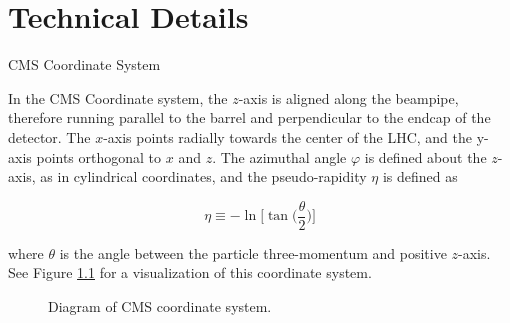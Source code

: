 \chapter{Technical Details}
\begin{section}{CMS Coordinate System}\label{appendix:cms-coords}

In the CMS Coordinate system, the $z$-axis is aligned along the beampipe, therefore running parallel to the barrel and perpendicular to the endcap of the detector. The $x$-axis points radially towards the center of the LHC, and the y-axis points orthogonal to $x$ and $z$. The azimuthal angle $\varphi$ is defined about the $z$-axis, as in cylindrical coordinates, and the pseudo-rapidity $\eta$ is defined as

\begin{equation}
    \eta \equiv -\ln{\bigg[ \tan{\bigg( \frac{\theta}{2} \bigg)} \bigg]}
\end{equation}

\noindent where $\theta$ is the angle between the particle three-momentum and positive $z$-axis. See Figure \ref{fig:cms-coords} for a visualization of this coordinate system.

\begin{figure}[htb]
\begin{center}

\end{center}
\caption{Diagram of CMS coordinate system.}
\label{fig:cms-coords}
\end{figure}

\end{section}

